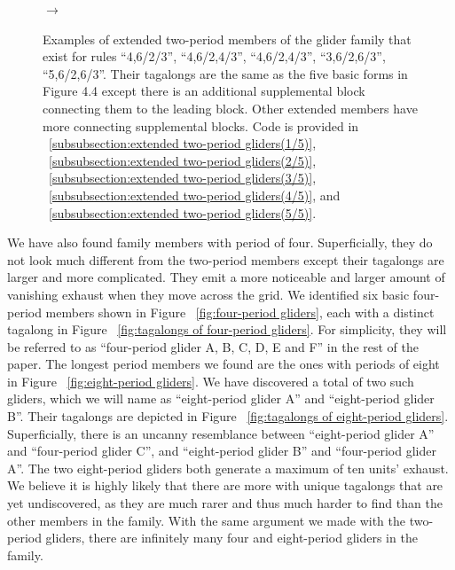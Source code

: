 \documentclass[12pt]{article}
\numberwithin{figure}{section} %
\begin{document}
\begin{figure}[H]
\begin{subfigure}{0.3\textwidth}
     \subcaption{}
   \end{subfigure}
      {\LARGE$\xrightarrow{}$}
   \setcounter{subfigure}{0}
   \caption[Extended two-period gliders]{Examples of extended two-period members of the glider family that exist for rules “4,6/2/3”, “4,6/2,4/3”, “4,6/2,4/3”, “3,6/2,6/3”, “5,6/2,6/3”. Their tagalongs are the same as the five basic forms in Figure 4.4 except there is an additional supplemental block connecting them to the leading block. Other extended members have more connecting supplemental blocks. Code is provided in ~\ref{subsubsection:extended two-period gliders(1/5)}, ~\ref{subsubsection:extended two-period gliders(2/5)}, ~\ref{subsubsection:extended two-period gliders(3/5)}, ~\ref{subsubsection:extended two-period gliders(4/5)}, and ~\ref{subsubsection:extended two-period gliders(5/5)}. }
   \label{fig:extended two-period gliders}
   \vspace{-1.5em}
\end{figure}

We have also found family members with period of four. Superficially, they do not look much different from the two-period members except their tagalongs are larger and more complicated. They emit a more noticeable and larger amount of vanishing exhaust when they move across the grid. We identified six basic four-period members shown in Figure ~\ref{fig:four-period gliders}, each with a distinct tagalong in Figure ~\ref{fig:tagalongs of four-period gliders}. For simplicity, they will be referred to as “four-period glider A, B, C, D, E and F” in the rest of the paper. The longest period members we found are the ones with periods of eight in Figure ~\ref{fig:eight-period gliders}. We have discovered a total of two such gliders, which we will name as “eight-period glider A” and “eight-period glider B”. Their tagalongs are depicted in Figure ~\ref{fig:tagalongs of eight-period gliders}. Superficially, there is an uncanny resemblance between “eight-period glider A” and “four-period glider C”, and “eight-period glider B” and “four-period glider A”. The two eight-period gliders both generate a maximum of ten units’ exhaust. We believe it is highly likely that there are more with unique tagalongs that are yet undiscovered, as they are much rarer and thus much harder to find than the other members in the family. With the same argument we made with the two-period gliders, there are infinitely many four and eight-period gliders in the family. 
\end{document}
